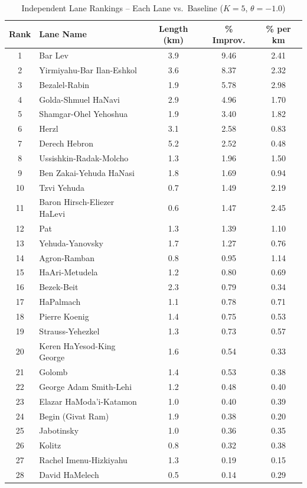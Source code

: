 \begin{table}[H]
\centering
\caption{Independent Lane Rankings -- Each Lane vs.\ Baseline ($K=5$, $\theta=-1.0$)}
\label{tab:lane_rankings}
\small
\begin{tabular}{@{}clccc@{}}
\toprule
\textbf{Rank} & \textbf{Lane Name} & \textbf{Length (km)} & \textbf{\% Improv.} & \textbf{\% per km} \\
\midrule
1 & Bar Lev & 3.9 & 9.46 & 2.41 \\
2 & Yirmiyahu-Bar Ilan-Eshkol & 3.6 & 8.37 & 2.32 \\
3 & Bezalel-Rabin & 1.9 & 5.78 & 2.98 \\
4 & Golda-Shmuel HaNavi & 2.9 & 4.96 & 1.70 \\
5 & Shamgar-Ohel Yehoshua & 1.9 & 3.40 & 1.82 \\
6 & Herzl & 3.1 & 2.58 & 0.83 \\
7 & Derech Hebron & 5.2 & 2.52 & 0.48 \\
8 & Ussishkin-Radak-Molcho & 1.3 & 1.96 & 1.50 \\
9 & Ben Zakai-Yehuda HaNasi & 1.8 & 1.69 & 0.94 \\
10 & Tzvi Yehuda & 0.7 & 1.49 & 2.19 \\
11 & Baron Hirsch-Eliezer HaLevi & 0.6 & 1.47 & 2.45 \\
12 & Pat & 1.3 & 1.39 & 1.10 \\
13 & Yehuda-Yanovsky & 1.7 & 1.27 & 0.76 \\
14 & Agron-Ramban & 0.8 & 0.95 & 1.14 \\
15 & HaAri-Metudela & 1.2 & 0.80 & 0.69 \\
16 & Bezek-Beit & 2.3 & 0.79 & 0.34 \\
17 & HaPalmach & 1.1 & 0.78 & 0.71 \\
18 & Pierre Koenig & 1.4 & 0.75 & 0.53 \\
19 & Strauss-Yehezkel & 1.3 & 0.73 & 0.57 \\
20 & Keren HaYesod-King George & 1.6 & 0.54 & 0.33 \\
21 & Golomb & 1.4 & 0.53 & 0.38 \\
22 & George Adam Smith-Lehi & 1.2 & 0.48 & 0.40 \\
23 & Elazar HaModa'i-Katamon & 1.0 & 0.40 & 0.39 \\
24 & Begin (Givat Ram) & 1.9 & 0.38 & 0.20 \\
25 & Jabotinsky & 1.0 & 0.36 & 0.35 \\
26 & Kolitz & 0.8 & 0.32 & 0.38 \\
27 & Rachel Imenu-Hizkiyahu & 1.3 & 0.19 & 0.15 \\
28 & David HaMelech & 0.5 & 0.14 & 0.29 \\
\bottomrule
\end{tabular}
\end{table}

